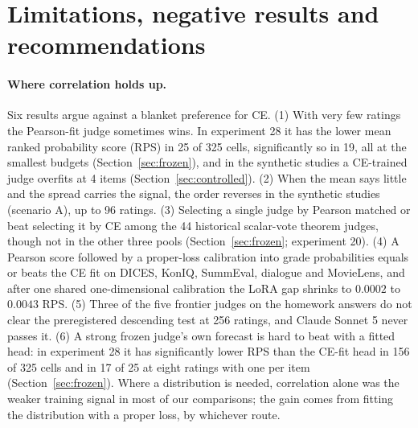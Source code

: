 \section{Limitations, negative results and recommendations}
\label{sec:limits}

\paragraph{Where correlation holds up.}
Six results argue against a blanket preference for CE.
(1) With very few ratings the Pearson-fit judge sometimes wins.
In experiment 28 it has the lower mean ranked probability score (RPS) in 25 of 325 cells, significantly so in 19, all at the smallest budgets (Section~\ref{sec:frozen}), and in the synthetic studies a CE-trained judge overfits at 4 items (Section~\ref{sec:controlled}).
(2) When the mean says little and the spread carries the signal, the order reverses in the synthetic studies (scenario A), up to 96 ratings.
(3) Selecting a single judge by Pearson matched or beat selecting it by CE among the 44 historical scalar-vote theorem judges, though not in the other three pools (Section~\ref{sec:frozen}; experiment 20).
(4) A Pearson score followed by a proper-loss calibration into grade probabilities equals or beats the CE fit on DICES, KonIQ, SummEval, dialogue and MovieLens, and after one shared one-dimensional calibration the LoRA gap shrinks to $0.0002$ to $0.0043$ RPS.
(5) Three of the five frontier judges on the homework answers do not clear the preregistered descending test at 256 ratings, and Claude Sonnet 5 never passes it.
(6) A strong frozen judge's own forecast is hard to beat with a fitted head: in experiment 28 it has significantly lower RPS than the CE-fit head in 156 of 325 cells and in 17 of 25 at eight ratings with one per item (Section~\ref{sec:frozen}).
Where a distribution is needed, correlation alone was the weaker training signal in most of our comparisons; the gain comes from fitting the distribution with a proper loss, by whichever route.


